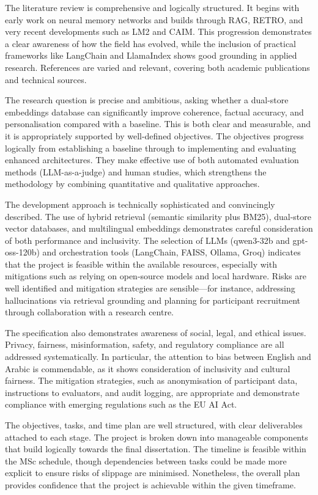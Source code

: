 \documentclass{report}
\begin{document}
The literature review is comprehensive and logically structured. It begins with early work on neural memory networks and builds through RAG, RETRO, and very recent developments such as LM2 and CAIM. This progression demonstrates a clear awareness of how the field has evolved, while the inclusion of practical frameworks like LangChain and LlamaIndex shows good grounding in applied research. References are varied and relevant, covering both academic publications and technical sources. 

The research question is precise and ambitious, asking whether a dual-store embeddings database can significantly improve coherence, factual accuracy, and personalisation compared with a baseline. This is both clear and measurable, and it is appropriately supported by well-defined objectives. The objectives progress logically from establishing a baseline through to implementing and evaluating enhanced architectures. They make effective use of both automated evaluation methods (LLM-as-a-judge) and human studies, which strengthens the methodology by combining quantitative and qualitative approaches.

The development approach is technically sophisticated and convincingly described. The use of hybrid retrieval (semantic similarity plus BM25), dual-store vector databases, and multilingual embeddings demonstrates careful consideration of both performance and inclusivity. The selection of LLMs (qwen3-32b and gpt-oss-120b) and orchestration tools (LangChain, FAISS, Ollama, Groq) indicates that the project is feasible within the available resources, especially with mitigations such as relying on open-source models and local hardware. Risks are well identified and mitigation strategies are sensible—for instance, addressing hallucinations via retrieval grounding and planning for participant recruitment through collaboration with a research centre.

The specification also demonstrates awareness of social, legal, and ethical issues. Privacy, fairness, misinformation, safety, and regulatory compliance are all addressed systematically. In particular, the attention to bias between English and Arabic is commendable, as it shows consideration of inclusivity and cultural fairness. The mitigation strategies, such as anonymisation of participant data, instructions to evaluators, and audit logging, are appropriate and demonstrate compliance with emerging regulations such as the EU AI Act.

The objectives, tasks, and time plan are well structured, with clear deliverables attached to each stage. The project is broken down into manageable components that build logically towards the final dissertation. The timeline is feasible within the MSc schedule, though dependencies between tasks could be made more explicit to ensure risks of slippage are minimised. Nonetheless, the overall plan provides confidence that the project is achievable within the given timeframe.
\end{document}
